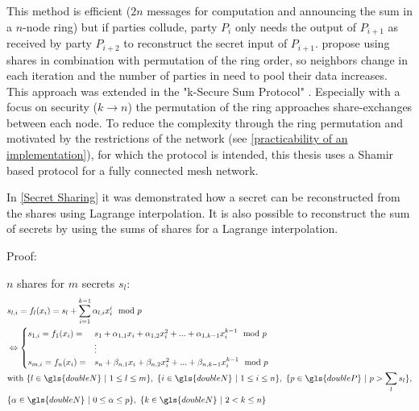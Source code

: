 This method is efficient ($2n$ messages for computation and announcing the sum in a $n$-node ring) but if parties collude, party $P_i$ only needs the output of $P_{i+1}$ as received by party $P_{i+2}$ to reconstruct the secret input of $P_{i+1}$. \textcite{Clifton2002} propose using shares in combination with permutation of the ring order, so neighbors change in each iteration and the number of parties in need to pool their data increases. This approach was extended in the "k-Secure Sum Protocol" \autocite{Sheikh2009}. Especially with a focus on security ($k\rightarrow n$) the permutation of the ring approaches share-exchanges between each node. To reduce the complexity through the ring permutation and motivated by the restrictions of the network (see \autoref{practicability of an implementation}), for which the protocol is intended, this thesis  uses a Shamir based protocol for a fully connected mesh network. 

In \ref{Secret Sharing} it was demonstrated how a secret can be reconstructed from the shares using Lagrange interpolation. It is also possible to reconstruct the sum of secrets by using the sums of shares for a Lagrange interpolation.

Proof:

$n$ shares for $m$ secrets $s_l$:
\begin{alignat}{1}
&s_{l,i} = f_l(x_i) = s_l + \sum_{i=1}^{k-1} \alpha_{l,i} x_i^i \mod p \\
& \Leftrightarrow \begin{cases}
s_{1,i} = f_1(x_i) = & s_1 + \alpha_{1,1} x_i + \alpha_{1,2} x_i^2 + ... + \alpha_{1,k-1}x_i^{k-1} \mod p \\
&\vdots \\
s_{m,i} = f_n(x_i) = & s_n + \beta_{n,1} x_i + \beta_{n,2} x_i^2 + ... + \beta_{n,k-1}x_i^{k-1} \mod p
\end{cases} \nonumber \\
& \text{with} \ \{l \in \gls{doubleN} \ | \ 1 \leq l \leq m \},
\ \{i \in \gls{doubleN} \ | \ 1 \leq i \leq n \},
\ \{ p \in \gls{doubleP} \ | \ p > \sum_l s_l \}, \nonumber \\
&\{ \alpha \in \gls{doubleN} \ | \ 0 \leq \alpha \leq p \},
\ \{k \in \gls{doubleN} \ | \ 2 < k \leq n \} \nonumber
\end{alignat}

